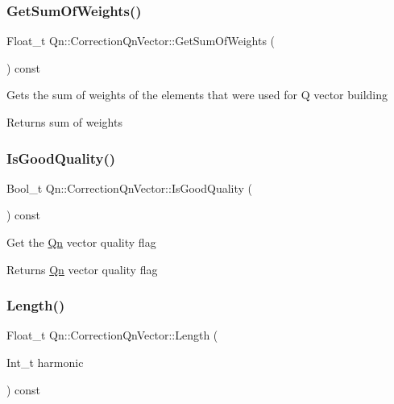 \subsubsection{\texorpdfstring{Get\+Sum\+Of\+Weights()}{GetSumOfWeights()}}
{\footnotesize\ttfamily Float\+\_\+t Qn\+::\+Correction\+Qn\+Vector\+::\+Get\+Sum\+Of\+Weights (\begin{DoxyParamCaption}{ }\end{DoxyParamCaption}) const\hspace{0.3cm}{\ttfamily [inline]}}

Gets the sum of weights of the elements that were used for Q vector building \begin{DoxyReturn}{Returns}
sum of weights 
\end{DoxyReturn}
\mbox{\label{classQn_1_1CorrectionQnVector_a314e710f1e4f6d09ab19907c5ecd48dc}} 
\subsubsection{\texorpdfstring{Is\+Good\+Quality()}{IsGoodQuality()}}
{\footnotesize\ttfamily Bool\+\_\+t Qn\+::\+Correction\+Qn\+Vector\+::\+Is\+Good\+Quality (\begin{DoxyParamCaption}{ }\end{DoxyParamCaption}) const\hspace{0.3cm}{\ttfamily [inline]}}

Get the \mbox{\hyperlink{namespaceQn}{Qn}} vector quality flag \begin{DoxyReturn}{Returns}
\mbox{\hyperlink{namespaceQn}{Qn}} vector quality flag 
\end{DoxyReturn}
\mbox{\label{classQn_1_1CorrectionQnVector_ad8b5dd08034a692eee13f2baa4d42269}} 
\subsubsection{\texorpdfstring{Length()}{Length()}}
{\footnotesize\ttfamily Float\+\_\+t Qn\+::\+Correction\+Qn\+Vector\+::\+Length (\begin{DoxyParamCaption}\item[{Int\+\_\+t}]{harmonic }\end{DoxyParamCaption}) const\hspace{0.3cm}{\ttfamily [inline]}}

